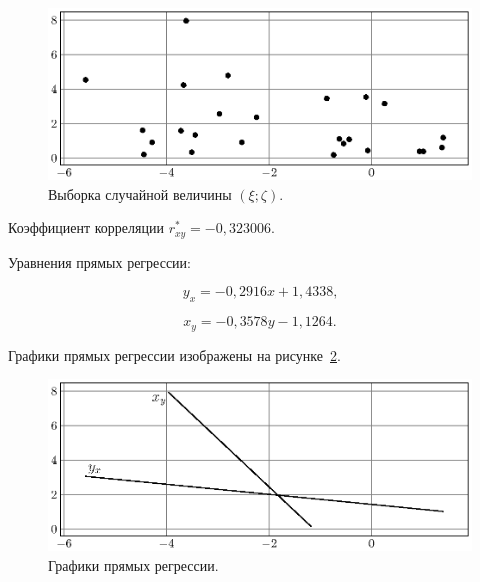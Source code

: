 \begin{figure}[h]
  \includegraphics[scale=1]{images/st.11.eps}
  \caption{Выборка случайной величины $(\xi;\zeta)$.}\label{pic:11}
\end{figure}




Коэффициент корреляции $ r^{*}_{xy} = -0{,}323006 $.

Уравнения прямых регрессии:


$$  
	y_x = -0{,}2916 x + 1{,}4338 \text{,}
$$


$$
	x_y = -0{,}3578 y  -1{,}1264 \text{.}
$$

Графики прямых регрессии изображены на рисунке~\ref{pic:12}.
\begin{figure}[h]
  \includegraphics[scale=1]{images/st.12.eps}
  \caption{Графики прямых регрессии.}\label{pic:12}
\end{figure}
\endinput

